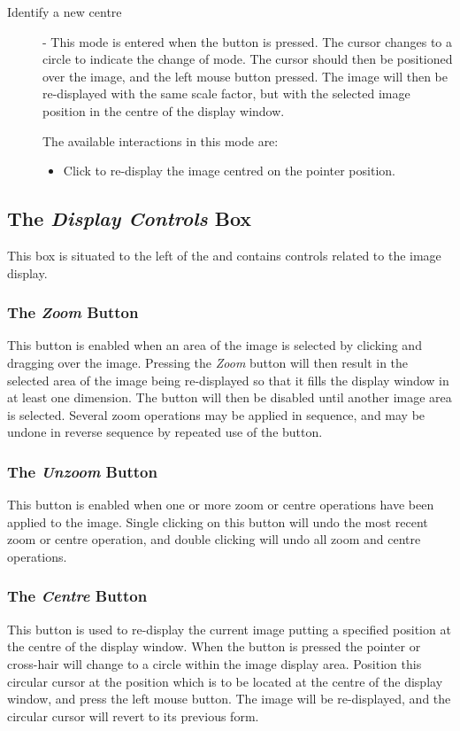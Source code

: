 \begin{description}
\item [ Identify a new centre] - This mode is
entered when the  button is pressed.
The cursor changes to a circle to indicate the change of mode. The cursor
should then be positioned over the image, and the left mouse button
pressed. The image will then be re-displayed with the same scale factor,
but with the selected image position in the centre of the display window.

The available interactions in this mode are:
\begin{itemize}
\item Click to re-display the image centred on the pointer position.
\end{itemize}

\end{description}

\subsection {The {\em Display Controls} Box}
This box is situated to the left of the  and contains controls related to the image
display.

\subsubsection {The {\em Zoom} Button}
This button is enabled when an area of the image is selected by clicking
and dragging over the image. Pressing the {\em Zoom} button will then
result in the selected area of the image being re-displayed so that it
fills the display window in at least one dimension. The button will then
be disabled until another image area is selected. Several zoom operations
may be applied in sequence, and may be undone in reverse sequence by
repeated use of the  button. 

\subsubsection {The {\em Unzoom} Button}
This button is enabled when one or more zoom or centre operations have 
been applied to the image. Single clicking on this button will undo the
most recent zoom or centre operation, and double clicking will undo
all zoom and centre operations.

\subsubsection {The {\em Centre} Button}
This button is used to re-display the current image putting a specified
position at the centre of the display window. When the button is pressed 
the pointer or cross-hair will change to a circle within the image display 
area. Position this circular cursor at the position which is to be
located at the centre of the display window, and press the left mouse
button. The image will be re-displayed, and the circular cursor will
revert to its previous form.


